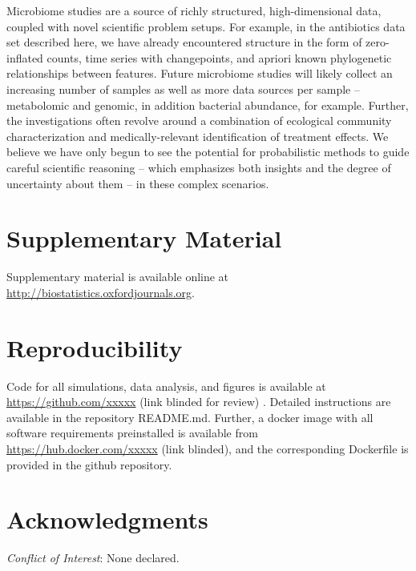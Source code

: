 \documentclass[oupdraft]{bio}
\begin{document}
Microbiome studies are a source of richly structured, high-dimensional data,
coupled with novel scientific problem setups. For example, in the antibiotics
data set described here, we have already encountered structure in the form of
zero-inflated counts, time series with changepoints, and apriori known
phylogenetic relationships between features. Future microbiome studies will
likely collect an increasing number of samples as well as more data sources per
sample -- metabolomic and genomic, in addition bacterial abundance, for example.
Further, the investigations often revolve around a combination of ecological
community characterization and medically-relevant identification of treatment
effects. We believe we have only begun to see the potential for probabilistic
methods to guide careful scientific reasoning -- which emphasizes both insights
and the degree of uncertainty about them -- in these complex scenarios.

\section{Supplementary Material}

Supplementary material is available online at
\url{http://biostatistics.oxfordjournals.org}.

\section{Reproducibility}

Code for all simulations, data analysis, and figures is available at
\url{https://github.com/xxxxx} (link blinded for review) . Detailed instructions
are available in the repository README.md. Further, a docker image with all
software requirements preinstalled is available from
\url{https://hub.docker.com/xxxxx} (link blinded), and the corresponding
Dockerfile is provided in the github repository.

\section*{Acknowledgments}


{\it Conflict of Interest}: None declared.



\end{document}
